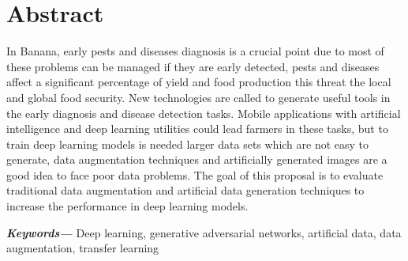 \chapter*{Abstract}

In Banana, early pests and diseases diagnosis is a crucial point due to most of these problems can be managed if they are early detected, pests and diseases affect a significant percentage of yield and food production this threat the local and global food security. New technologies are called to generate useful tools in the early diagnosis and disease detection tasks. Mobile applications with artificial intelligence and deep learning utilities could lead farmers in these tasks, but to train deep learning models is needed larger data sets which are not easy to generate, data augmentation techniques and artificially generated images are a good idea to face poor data problems. The goal of this proposal is to evaluate traditional data augmentation and artificial data generation techniques to increase the performance in deep learning models.

\providecommand{\keywords}[1]
{
  \small	
  \textbf{\textit{Keywords---}} #1
}

\keywords{Deep learning, generative adversarial networks, artificial data, data augmentation, transfer learning}